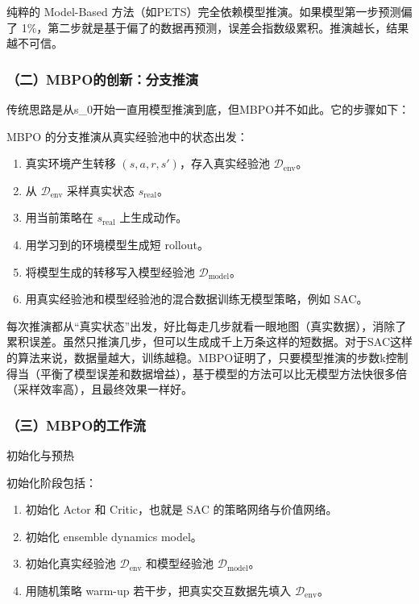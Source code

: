 纯粹的 Model-Based 方法（如PETS）完全依赖模型推演。如果模型第一步预测偏了 1\%，第二步就是基于偏了的数据再预测，误差会指数级累积。推演越长，结果越不可信。

\hypertarget{ux4e8cmbpoux7684ux521bux65b0ux5206ux652fux63a8ux6f14}{%
\subsubsection{（二）MBPO的创新：分支推演}\label{ux4e8cmbpoux7684ux521bux65b0ux5206ux652fux63a8ux6f14}}

传统思路是从s\_0开始一直用模型推演到底，但MBPO并不如此。它的步骤如下：

MBPO 的分支推演从真实经验池中的状态出发：

\begin{enumerate}
\def\labelenumi{\arabic{enumi}.}
\tightlist
\item
  真实环境产生转移 \((s,a,r,s')\)，存入真实经验池 \(\mathcal D_{\mathrm{env}}\)。
\item
  从 \(\mathcal D_{\mathrm{env}}\) 采样真实状态 \(s_{\mathrm{real}}\)。
\item
  用当前策略在 \(s_{\mathrm{real}}\) 上生成动作。
\item
  用学习到的环境模型生成短 rollout。
\item
  将模型生成的转移写入模型经验池 \(\mathcal D_{\mathrm{model}}\)。
\item
  用真实经验池和模型经验池的混合数据训练无模型策略，例如 SAC。
\end{enumerate}

每次推演都从``真实状态''出发，好比每走几步就看一眼地图（真实数据），消除了累积误差。虽然只推演几步，但可以生成成千上万条这样的短数据。对于SAC这样的算法来说，数据量越大，训练越稳。MBPO证明了，只要模型推演的步数k控制得当（平衡了模型误差和数据增益），基于模型的方法可以比无模型方法快很多倍（采样效率高），且最终效果一样好。

\hypertarget{ux4e09mbpoux7684ux5de5ux4f5cux6d41}{%
\subsubsection{（三）MBPO的工作流}\label{ux4e09mbpoux7684ux5de5ux4f5cux6d41}}

初始化与预热

初始化阶段包括：

\begin{enumerate}
\def\labelenumi{\arabic{enumi}.}
\tightlist
\item
  初始化 Actor 和 Critic，也就是 SAC 的策略网络与价值网络。
\item
  初始化 ensemble dynamics model。
\item
  初始化真实经验池 \(\mathcal D_{\mathrm{env}}\) 和模型经验池 \(\mathcal D_{\mathrm{model}}\)。
\item
  用随机策略 warm-up 若干步，把真实交互数据先填入 \(\mathcal D_{\mathrm{env}}\)。
\end{enumerate}

